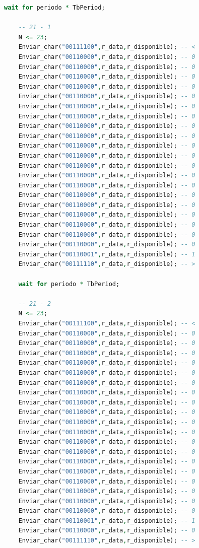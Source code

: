 \begin{lstlisting}[language = vhdl,caption=Testbench del módulo UART,label={lst:test_uart}]
	wait for periodo * TbPeriod;

	-- 21 - 1
	N <= 23; 	
	Enviar_char("00111100",r_data,r_disponible); -- < 	
	Enviar_char("00110000",r_data,r_disponible); -- 0 	
	Enviar_char("00110000",r_data,r_disponible); -- 0
 	Enviar_char("00110000",r_data,r_disponible); -- 0 	
	Enviar_char("00110000",r_data,r_disponible); -- 0
	Enviar_char("00110000",r_data,r_disponible); -- 0 	
	Enviar_char("00110000",r_data,r_disponible); -- 0
	Enviar_char("00110000",r_data,r_disponible); -- 0 	
	Enviar_char("00110000",r_data,r_disponible); -- 0
	Enviar_char("00110000",r_data,r_disponible); -- 0 	
	Enviar_char("00110000",r_data,r_disponible); -- 0
	Enviar_char("00110000",r_data,r_disponible); -- 0 	
	Enviar_char("00110000",r_data,r_disponible); -- 0
	Enviar_char("00110000",r_data,r_disponible); -- 0 	
	Enviar_char("00110000",r_data,r_disponible); -- 0
	Enviar_char("00110000",r_data,r_disponible); -- 0 	
	Enviar_char("00110000",r_data,r_disponible); -- 0
	Enviar_char("00110000",r_data,r_disponible); -- 0 	
	Enviar_char("00110000",r_data,r_disponible); -- 0
	Enviar_char("00110000",r_data,r_disponible); -- 0 	
	Enviar_char("00110000",r_data,r_disponible); -- 0
	Enviar_char("00110001",r_data,r_disponible); -- 1 	
	Enviar_char("00111110",r_data,r_disponible); -- >

	wait for periodo * TbPeriod;

	-- 21 - 2
	N <= 23; 	
	Enviar_char("00111100",r_data,r_disponible); -- < 	
	Enviar_char("00110000",r_data,r_disponible); -- 0 	
	Enviar_char("00110000",r_data,r_disponible); -- 0
 	Enviar_char("00110000",r_data,r_disponible); -- 0 	
	Enviar_char("00110000",r_data,r_disponible); -- 0
	Enviar_char("00110000",r_data,r_disponible); -- 0 	
	Enviar_char("00110000",r_data,r_disponible); -- 0
	Enviar_char("00110000",r_data,r_disponible); -- 0 	
	Enviar_char("00110000",r_data,r_disponible); -- 0
	Enviar_char("00110000",r_data,r_disponible); -- 0 	
	Enviar_char("00110000",r_data,r_disponible); -- 0
	Enviar_char("00110000",r_data,r_disponible); -- 0 	
	Enviar_char("00110000",r_data,r_disponible); -- 0
	Enviar_char("00110000",r_data,r_disponible); -- 0 	
	Enviar_char("00110000",r_data,r_disponible); -- 0
	Enviar_char("00110000",r_data,r_disponible); -- 0 	
	Enviar_char("00110000",r_data,r_disponible); -- 0
	Enviar_char("00110000",r_data,r_disponible); -- 0 	
	Enviar_char("00110000",r_data,r_disponible); -- 0
	Enviar_char("00110000",r_data,r_disponible); -- 0 	
	Enviar_char("00110001",r_data,r_disponible); -- 1
	Enviar_char("00110000",r_data,r_disponible); -- 0 	
	Enviar_char("00111110",r_data,r_disponible); -- >


\end{lstlisting}
